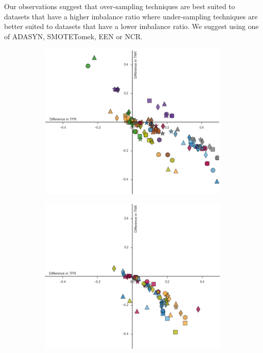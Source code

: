 \documentclass{sig-alternate-05-2015}
\begin{document}
	Our observations suggest that over-sampling techniques are best suited to datasets that have a higher imbalance ratio where under-sampling techniques are better suited to datasets that have a lower imbalance ratio. We suggest using one of ADASYN, SMOTETomek, EEN or NCR.
	
	\begin{figure}		
		\centering
		\vspace*{1.2cm}\hspace*{-1.5cm}\begin{subfigure}{.5\textwidth}
		\includegraphics[scale=0.5]{classifier_dataset_plt_2016-11-10_12-19-03}
		\end{subfigure}\hspace*{4cm}\vspace*{-0.5cm}%
		\hspace*{-2cm}\begin{subfigure}{.5\textwidth}
			\includegraphics[scale=0.5]{classifier_dataset_plt_2016-11-10_12-22-43}

\end{subfigure}
\end{figure}
\end{document}
